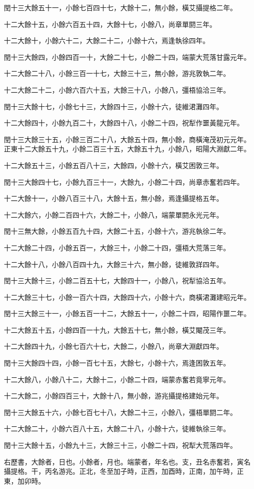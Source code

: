 閏十三大餘五十一，小餘七百四十七，大餘十二，無小餘，橫艾攝提格二年。

十二大餘十五，小餘六百五十四，大餘十七，小餘八，尚章單閼三年。

十二大餘十，小餘六十二，大餘二十二，小餘十六，焉逢執徐四年。

閏十三大餘四，小餘四百一十，大餘二十七，小餘二十四，端蒙大荒落甘露元年。

十二大餘二十八，小餘三百一十七，大餘三十三，無小餘，游兆敦執二年。

十二大餘二十二，小餘六百六十五，大餘三十八，小餘八，彊梧協洽三年。

閏十三大餘十七，小餘七十三，大餘四十三，小餘十六，徒維涒灘四年。

十二大餘四十，小餘九百二十，大餘四十八，小餘二十四，祝犁作噩黃龍元年。

閏十三大餘三十五，小餘三百二十八，大餘五十四，無小餘，商橫淹茂初元元年。正東十二大餘五十九，小餘二百三十五，大餘五十九，小餘八，昭陽大淵獻二年。

十二大餘五十三，小餘五百八十三，大餘四，小餘十六，橫艾困敦三年。

閏十三大餘四十七，小餘九百三十一，大餘九，小餘二十四，尚章赤奮若四年。

十二大餘十一，小餘八百三十八，大餘十五，無小餘，焉逢攝提格五年。

十二大餘六，小餘二百四十六，大餘二十，小餘八，端蒙單閼永光元年。

閏十三無大餘，小餘五百九十四，大餘二十五，小餘十六，游兆執徐二年。

十二大餘二十四，小餘五百一，大餘三十，小餘二十四，彊梧大荒落三年。

十二大餘十八，小餘八百四十九，大餘三十六，無小餘，徒維敦牂四年。

閏十三大餘十三，小餘二百五十七，大餘四十一，小餘八，祝犁協洽五年。

十二大餘三十七，小餘一百六十四，大餘四十六，小餘十六，商橫涒灘建昭元年。

閏十三大餘三十一，小餘五百一十二，大餘五十一，小餘二十四，昭陽作噩二年。

十二大餘五十五，小餘四百一十九，大餘五十七，無小餘，橫艾閹茂三年。

十二大餘四十九，小餘七百六十七，大餘二，小餘八，尚章大淵獻四年。

閏十三大餘四十四，小餘一百七十五，大餘七，小餘十六，焉逢困敦五年。

十二大餘八，小餘八十二，大餘十二，小餘二十四，端蒙赤奮若竟寧元年。

十二大餘二，小餘四百三十，大餘十八，無小餘，游兆攝提格建始元年。

閏十三大餘五十六，小餘七百七十八，大餘二十三，小餘八，彊梧單閼二年。

十二大餘二十，小餘六百八十五，大餘二十八，小餘十六，徒維執徐三年。

閏十三大餘十五，小餘九十三，大餘三十三，小餘二十四，祝犁大荒落四年。

右歷書，大餘者，日也。小餘者，月也。端蒙者，年名也。支，丑名赤奮若，寅名攝提格。干，丙名游兆。正北，冬至加子時，正西，加酉時，正南，加午時，正東，加卯時。